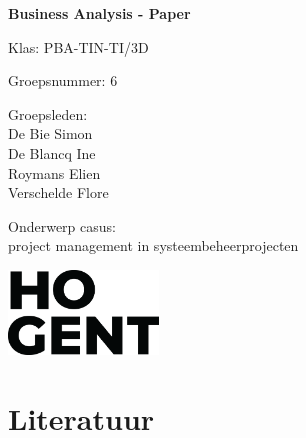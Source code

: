 \documentclass{article}
\begin{document}
    
    \begin{titlepage}
        \centering
        \vspace*{2cm}
        
        {\Huge \textbf{Business Analysis - Paper}}\\
        \vspace{1.5cm}
        
        {\Large Klas:  PBA-TIN-TI/3D}\\
        \vspace{0.5cm}
        
        {\Large Groepsnummer: 6}\\
        \vspace{0.5cm}
        
        {\Large Groepsleden: \\
            De Bie Simon\\
            De Blancq Ine\\
            Roymans Elien\\[0.15cm]
            Verschelde Flore}\\
        \vspace{1.0cm}
        
        {\Large Onderwerp casus:\\ project management in systeembeheerprojecten}\\
        
        \vfill
        
        \begin{flushright}
            \includegraphics[width=0.3\textwidth]{logo.png}
        \end{flushright}
    \end{titlepage}

    \tableofcontents
    \newpage

    \setcounter{page}{1}

    \section{Literatuur}
\end{document}
